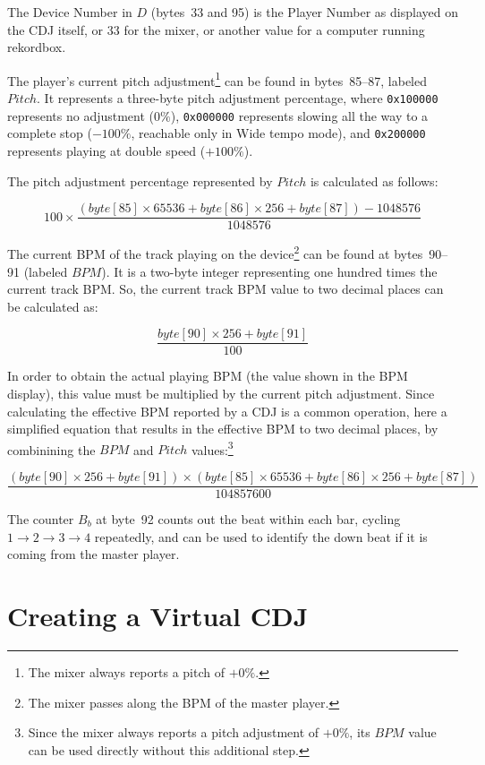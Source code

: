 \documentclass[11pt]{article}
\begin{document}
The Device Number in $D$ (bytes~33 and 95) is the Player Number as
displayed on the CDJ itself, or 33 for the mixer, or another value for
a computer running rekordbox.

The player's current pitch adjustment\footnote{The mixer always
  reports a pitch of $+0\%$.} can be found in bytes~85--87, labeled
$Pitch$. It represents a three-byte pitch adjustment percentage, where
{\tt 0x100000} represents no adjustment ($0\%$), {\tt 0x000000}
represents slowing all the way to a complete stop ($-100\%$, reachable
only in Wide tempo mode), and {\tt 0x200000} represents playing at
double speed ($+100\%$).

The pitch adjustment percentage represented by $Pitch$ is calculated
as follows:

\begin{displaymath}
  100 \times
  \frac{(byte[85] \times 65536 + byte[86]  \times 256 + byte[87]) - 1048576}{1048576}
\end{displaymath}

The current BPM of the track playing on the device\footnote{The mixer
  passes along the BPM of the master player.} can be found at bytes~90--91
(labeled $BPM$). It is a two-byte integer representing one hundred
times the current track BPM. So, the current track BPM value to two
decimal places can be calculated as:

\[ \frac{byte[90] \times 256 + byte[91]}{100} \]

In order to obtain the actual playing BPM (the value shown in the BPM
display), this value must be multiplied by the current pitch
adjustment. Since calculating the effective BPM reported by a CDJ is a
common operation, here a simplified equation that results in the
effective BPM to two decimal places, by combinining the $BPM$ and
$Pitch$ values:\footnote{Since the mixer always reports a pitch
  adjustment of $+0\%$, its $BPM$ value can be used directly without
  this additional step.}

\[ \frac{(byte[90] \times 256 + byte[91]) \times (byte[85] \times 65536 + byte[86]  \times 256 + byte[87])}
   {104857600} \]

The counter $B_b$ at byte~92 counts out the beat within each bar,
cycling $1\to2\to3\to4$ repeatedly, and can be used to identify the
down beat if it is coming from the master player.

\section{Creating a Virtual CDJ}
\label{sec:virtualCdj}
\end{document}
